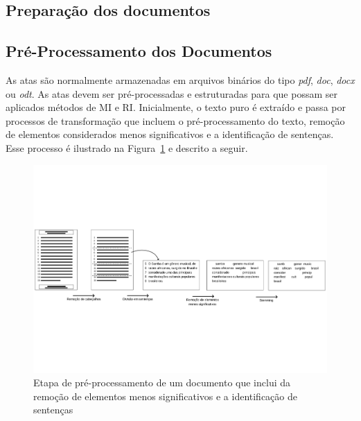 
\subsection{Preparação dos documentos}




\subsection{Pré-Processamento dos Documentos}

As atas são normalmente armazenadas em arquivos binários do tipo \textit{pdf}, \textit{doc}, \textit{docx} ou \textit{odt}. As atas devem ser pré-processadas e estruturadas para que possam ser aplicados métodos de MI e RI. Inicialmente, o texto puro é extraído e passa por processos de transformação que incluem o pré-processamento do texto, remoção de elementos considerados menos significativos e a identificação de sentenças. Esse processo é ilustrado na Figura~\ref{fig:preprocessamento-segmentacao} e descrito a seguir.

	

\begin{center}
	\begin{figure}[h!]

	\includegraphics[trim={ 0 180 0 180 },clip,page=1,width=\textwidth]{conteudo/capitulos/figs/pre-process.pdf}

	\caption{Etapa de pré-processamento de um documento que inclui da remoção de elementos menos significativos e a identificação de sentenças}
	\label{fig:preprocessamento-segmentacao}
	\end{figure}
\end{center}



